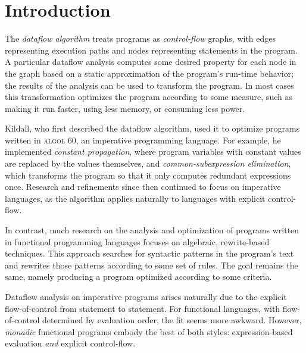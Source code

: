 \dodocclass



\chapter{Introduction}

The \emph{dataflow algorithm} treats programs as \emph{control-flow}
graphs, with edges representing execution paths and nodes representing
statements in the program. A particular dataflow analysis computes
some desired property for each node in the graph based on a static
approximation of the program's run-time behavior; the results of the
analysis can be used to transform the program. In most cases this
transformation optimizes the program according to some measure, such
as making it run faster, using less memory, or consuming less power.

Kildall, who first described the dataflow algorithm, used it to
optimize programs written in \textsc{algol 60},
an imperative programming language. For example, he implemented
\emph{constant propagation}, where program variables with constant values
are replaced by the values themselves, and \emph{common-subexpression
elimination}, which transforms the program so that it only computes
redundant expressions once. Research and refinements since then
continued to focus on imperative languages, as the algorithm applies
naturally to languages with explicit control-flow.

 In
contrast, much research on the analysis and optimization of programs
written in functional programming languages focuses on algebraic,
rewrite-based techniques. This approach searches for syntactic
patterns in the program's text and rewrites those patterns according
to some set of rules. The goal remains the same, namely producing a
program optimized according to some criteria. 

Dataflow analysis on imperative programs arises naturally due to the
explicit flow-of-control from statement to statement. For functional
languages, with flow-of-control determined by evaluation order, the
fit seems more awkward. However, \emph{monadic} functional programs
embody the best of both styles: expression-based evaluation \emph{and}
explicit control-flow.

